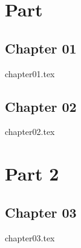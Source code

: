 \documentclass[12pt, openany]{book}
\begin{document}
\tableofcontents

\listoffigures

\listoftables


\mainmatter

\part{Part}

\chapter{Chapter 01}
{chapter01.tex}

\chapter{Chapter 02}
{chapter02.tex}

\part{Part 2}

\chapter{Chapter 03}
{chapter03.tex}
\end{document}
